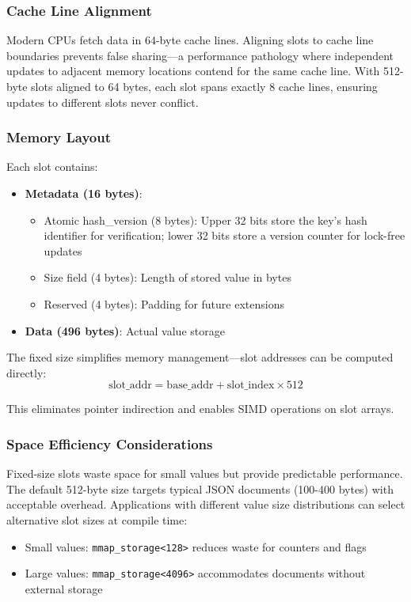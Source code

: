 \documentclass[10pt,conference]{IEEEtran}
\begin{document}
\subsubsection{Cache Line Alignment}
Modern CPUs fetch data in 64-byte cache lines. Aligning slots to cache line boundaries prevents false sharing—a performance pathology where independent updates to adjacent memory locations contend for the same cache line. With 512-byte slots aligned to 64 bytes, each slot spans exactly 8 cache lines, ensuring updates to different slots never conflict.

\subsubsection{Memory Layout}
Each slot contains:
\begin{itemize}
\item \textbf{Metadata (16 bytes)}:
  \begin{itemize}
  \item Atomic hash\_version (8 bytes): Upper 32 bits store the key's hash identifier for verification; lower 32 bits store a version counter for lock-free updates
  \item Size field (4 bytes): Length of stored value in bytes
  \item Reserved (4 bytes): Padding for future extensions
  \end{itemize}
\item \textbf{Data (496 bytes)}: Actual value storage
\end{itemize}

The fixed size simplifies memory management—slot addresses can be computed directly:
\begin{equation}
\text{slot\_addr} = \text{base\_addr} + \text{slot\_index} \times 512
\end{equation}

This eliminates pointer indirection and enables SIMD operations on slot arrays.

\subsubsection{Space Efficiency Considerations}
Fixed-size slots waste space for small values but provide predictable performance. The default 512-byte size targets typical JSON documents (100-400 bytes) with acceptable overhead. Applications with different value size distributions can select alternative slot sizes at compile time:
\begin{itemize}
\item Small values: \texttt{mmap\_storage<128>} reduces waste for counters and flags
\item Large values: \texttt{mmap\_storage<4096>} accommodates documents without external storage
\end{itemize}
\end{document}
